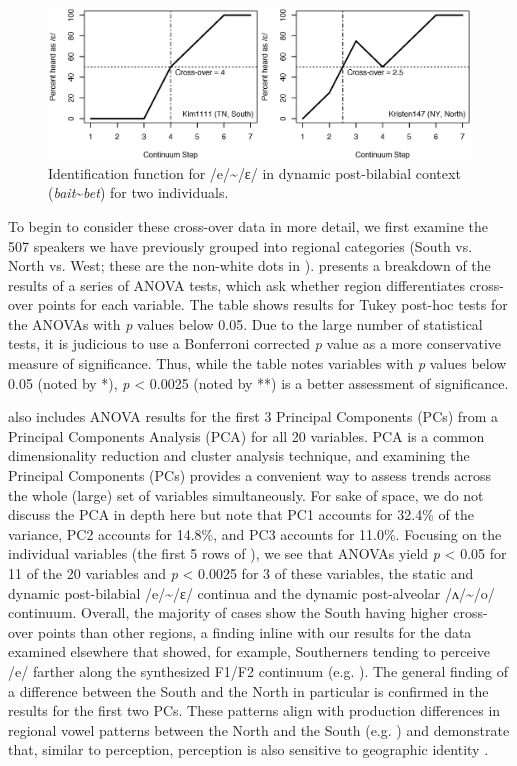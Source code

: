 \documentclass[output=paper]{LSP/langsci}
\begin{document}
\begin{figure}[t]
\includegraphics[width=\textwidth]{illustrations/kend_frid_fig2}
\caption{Identification function for /e/{\textasciitilde}/ɛ/ in dynamic post-bilabial context (\textit{bait}{\textasciitilde}\textit{bet}) for two individuals.}
\label{fig:2}
\end{figure}
 
\largerpage
To begin to consider these cross-over data in more detail, we first examine the 507 speakers we have previously grouped into regional categories (South vs. North vs. West; these are the non-white dots in ).  presents a breakdown of the results of a series of ANOVA tests, which ask whether region differentiates cross-over points for each variable. The table shows results for Tukey post-hoc tests for the ANOVAs with \textit{p }values below 0.05. Due to the large number of statistical tests, it is judicious to use a Bonferroni corrected \textit{p }value as a more conservative measure of significance. Thus, while the table notes variables with \textit{p }values below 0.05 (noted by *), \textit{p }{\textless} 0.0025 (noted by **) is a better assessment of significance.

 also includes ANOVA results for the first 3 Principal Components (PCs) from a Principal Components Analysis (PCA) for all 20 variables. PCA is a common dimensionality reduction and cluster analysis technique, and examining the Principal Components (PCs) provides a convenient way to assess trends across the whole (large) set of variables simultaneously. For sake of space, we do not discuss the PCA in depth here but note that PC1 accounts for 32.4\% of the variance, PC2 accounts for 14.8\%, and PC3 accounts for 11.0\%. Focusing on the individual variables (the first 5 rows of ), we see that ANOVAs yield \textit{p }{\textless} 0.05 for 11 of the 20 variables and \textit{p }{\textless} 0.0025 for 3 of these variables, the static and dynamic post-bilabial /e/{\textasciitilde}/ɛ/ continua and the dynamic post-alveolar /ʌ/{\textasciitilde}/o/ continuum. Overall, the majority of cases show the South having higher cross-over points than other regions, a finding inline with our results for the data examined elsewhere that showed, for example, Southerners tending to perceive /e/ farther along the synthesized F1/F2 continuum (e.g. \citealt{kendall_variation_2012}). The general finding of a difference between the South and the North in particular is confirmed in the results for the first two PCs. These patterns align with production differences in regional vowel patterns between the North and the South (e.g. \citealt{labov_atlas_2006-1}) and demonstrate that, similar to perception, perception is also sensitive to geographic identity \citep{fridland_exploring_2012}.
\end{document}
